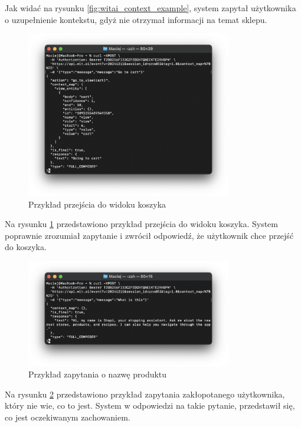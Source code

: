 Jak widać na rysunku \ref{fig:witai_context_example}, system zapytał użytkownika o uzupełnienie kontekstu, gdyż nie otrzymał informacji na temat sklepu.

\begin{figure}[H]
    \centering
    \includegraphics[width=0.8\textwidth]{images/witai_go_to_cart.png}
    \caption{Przykład przejścia do widoku koszyka}
    \label{fig:witai_cart_example}
\end{figure}

Na rysunku \ref{fig:witai_cart_example} przedstawiono przykład przejścia do widoku koszyka. System poprawnie zrozumiał zapytanie i zwrócił odpowiedź, że użytkownik chce przejść do koszyka.

\begin{figure}
    \centering
    \includegraphics[width=0.8\textwidth]{images/witai_what_is_this.png}
    \caption{Przykład zapytania o nazwę produktu}
    \label{fig:witai_what_is_this}
\end{figure}

Na rysunku \ref{fig:witai_what_is_this} przedstawiono przykład zapytania zakłopotanego użytkownika, który nie wie, co to jest. System w odpowiedzi na takie pytanie, przedstawił się, co jest oczekiwanym zachowaniem.